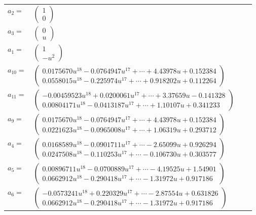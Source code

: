 \documentclass[1p]{elsarticle_modified}
\theoremstyle{definition}
\begin{document}
\begin{tabular}{m{7pt} m{180pt} m{7pt} m{180pt} }
\flushright $a_{2}=$&$\begin{pmatrix}1\\0\end{pmatrix}$ \\
\flushright $a_{3}=$&$\begin{pmatrix}0\\u\end{pmatrix}$ \\
\flushright $a_{1}=$&$\begin{pmatrix}1\\- u^2\end{pmatrix}$ \\
\flushright $a_{10}=$&$\begin{pmatrix}0.0175670 u^{18}-0.0764947 u^{17}+\cdots+4.43978 u+0.152384\\0.0558015 u^{18}-0.225974 u^{17}+\cdots+0.918202 u+0.112264\end{pmatrix}$ \\
\flushright $a_{11}=$&$\begin{pmatrix}-0.00459523 u^{18}+0.0200061 u^{17}+\cdots+3.37659 u-0.141328\\0.00804171 u^{18}-0.0413187 u^{17}+\cdots+1.10107 u+0.341233\end{pmatrix}$ \\
\flushright $a_{9}=$&$\begin{pmatrix}0.0175670 u^{18}-0.0764947 u^{17}+\cdots+4.43978 u+0.152384\\0.0221623 u^{18}-0.0965008 u^{17}+\cdots+1.06319 u+0.293712\end{pmatrix}$ \\
\flushright $a_{4}=$&$\begin{pmatrix}0.0168589 u^{18}-0.0901711 u^{17}+\cdots-2.65099 u+0.926294\\0.0247508 u^{18}-0.110253 u^{17}+\cdots-0.106730 u+0.303577\end{pmatrix}$ \\
\flushright $a_{5}=$&$\begin{pmatrix}0.00896711 u^{18}-0.0700889 u^{17}+\cdots-4.19525 u+1.54901\\0.0662912 u^{18}-0.290418 u^{17}+\cdots-1.31972 u+0.917186\end{pmatrix}$ \\
\flushright $a_{6}=$&$\begin{pmatrix}-0.0573241 u^{18}+0.220329 u^{17}+\cdots-2.87554 u+0.631826\\0.0662912 u^{18}-0.290418 u^{17}+\cdots-1.31972 u+0.917186\end{pmatrix}$ \\

\end{tabular}
\end{document}
